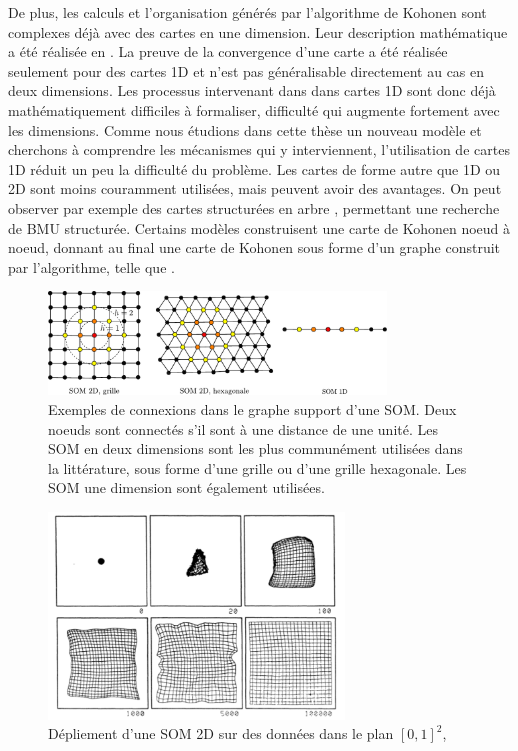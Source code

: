 De plus, les calculs et l'organisation générés par l'algorithme de Kohonen sont complexes déjà avec des cartes en une dimension. Leur description mathématique a été réalisée en \cite{cottrell_theoretical_2016,cottrell_theoretical_1998,fort_soms_2006}. La preuve de la convergence d'une carte a été réalisée seulement pour des cartes 1D et n'est pas généralisable directement au cas en deux dimensions. Les processus intervenant dans dans cartes 1D sont donc déjà mathématiquement difficiles à formaliser, difficulté qui augmente fortement avec les dimensions. Comme nous étudions dans cette thèse un nouveau modèle et cherchons à comprendre les mécanismes qui y interviennent, l'utilisation de cartes 1D réduit un peu la difficulté du problème. 
Les cartes de forme autre que 1D ou 2D sont moins couramment utilisées, mais peuvent avoir des avantages. On peut observer par exemple des cartes structurées en arbre \cite{koikkalainen_self-organizing_1990}, permettant une recherche de BMU structurée. Certains modèles construisent une carte de Kohonen noeud à noeud, donnant au final une carte de Kohonen sous forme d'un graphe construit par l'algorithme, telle que \cite{alahakoon_dynamic_2000}. 
\begin{figure}
\centering
\includegraphics[width=0.8\textwidth]{soms_topologies}
\caption{Exemples de connexions dans le graphe support d'une SOM. Deux noeuds sont connectés s'il sont à une distance de une unité. Les SOM en deux dimensions sont les plus communément utilisées dans la littérature, sous forme d'une grille ou d'une grille hexagonale. Les SOM une dimension sont également utilisées.}
\label{fig:topo}
\end{figure}

\begin{figure}
\centering
\includegraphics[width=0.7\textwidth]{som2d}
\caption{Dépliement d'une SOM 2D sur des données dans le plan $[0,1]^2$, \cite{Kohonen1995SelfOrganizingM} \label{fig:som2d}}

\end{figure}

